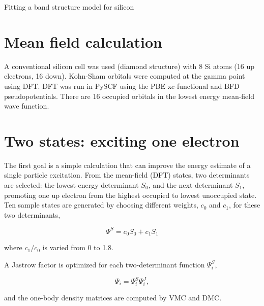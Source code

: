 



\begin{center}
{\Large Fitting a band structure model for silicon}
\end{center}

\section{Mean field calculation}

A conventional silicon cell was used (diamond structure) with 8 Si atoms (16 up electrons, 16 down).
Kohn-Sham orbitals were computed at the gamma point using DFT.
DFT was run in PySCF using the PBE xc-functional and BFD pseudopotentials.
There are 16 occupied orbitals in the lowest energy mean-field wave function.


\section {Two states: exciting one electron}


The first goal is a simple calculation that can improve the energy estimate of a single particle excitation.
From the mean-field (DFT) states, two determinants are selected: the lowest energy determinant $S_0$, and the next determinant $S_1$, promoting one up electron from the highest occupied to lowest unoccupied state.
Ten sample states are generated by choosing different weights, $c_0$ and $c_1$, for these two determinants,

\[ \Psi^S = c_{0}S_0 + c_{1}S_1 \]

where $c_{1}/c_{0}$  is varied from 0 to 1.8.

A Jastrow factor is optimized for each two-determinant function $\Psi_i^S$,

\[\Psi_i = \Psi_i^S \Psi_i^J,\]

and the one-body density matrices are computed by VMC and DMC.


